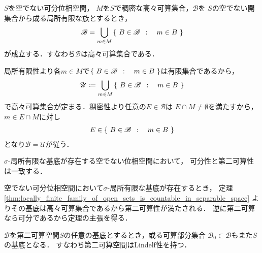 	\begin{screen}
		\begin{thm}[可分空間の局所有限な開集合族は高々有限集合]
		\label{thm:locally_finite_family_of_open_sets_is_countable_in_separable_space}
			$S$を空でない可分位相空間，
			$M$を$S$で稠密な高々可算集合，$\mathscr{B}$を
			$S$の空でない開集合から成る局所有限な族とするとき，
			\begin{align}
				\mathscr{B} = \bigcup_{m \in M} \left\{\ B \in \mathscr{B}\ \, : \quad m \in B\ \right\}
			\end{align}
			が成立する．すなわち$\mathscr{B}$は高々可算集合である．
		\end{thm}
	\end{screen}
	
	\begin{prf}
		局所有限性より各$m \in M$で$\left\{\ B \in \mathscr{B}\ \, : \quad m \in B\ \right\}$は有限集合であるから，
		\begin{align}
			\mathscr{U} \coloneqq \bigcup_{m \in M} \left\{\ B \in \mathscr{B}\ \, : \quad m \in B\ \right\}
		\end{align}
		で高々可算集合が定まる．稠密性より任意の$E \in \mathscr{B}$は
		$E \cap M \neq \emptyset$を満たすから，$m \in E \cap M$に対し
		\begin{align}
			E \in \left\{\ B \in \mathscr{B}\ \, : \quad m \in B\ \right\}
		\end{align}
		となり$\mathscr{B} = \mathscr{U}$が従う．
		\QED	
	\end{prf}
	
	\begin{screen}
		\begin{thm}
			$\sigma$-局所有限な基底が存在する空でない位相空間において，
			可分性と第二可算性は一致する．
		\end{thm}
	\end{screen}
	
	\begin{prf}
		空でない可分位相空間において$\sigma$-局所有限な基底が存在するとき，
		定理\ref{thm:locally_finite_family_of_open_sets_is_countable_in_separable_space}
		よりその基底は高々可算集合であるから第二可算性が満たされる．
		逆に第二可算なら可分であるから定理の主張を得る．
		\QED
	\end{prf}
	
	\begin{screen}
		\begin{thm}[第二可算空間の任意の基底は可算基を内包する]\label{thm:countable_base_of_second_countable_space}
			$\mathscr{B}$を第二可算空間$S$の任意の基底とするとき，或る可算部分集合
			$\mathscr{B}_0 \subset \mathscr{B}$もまた$S$の基底となる．
			すなわち第二可算空間はLindel\Ddot{o}f性を持つ．
		\end{thm}
	\end{screen}
	

